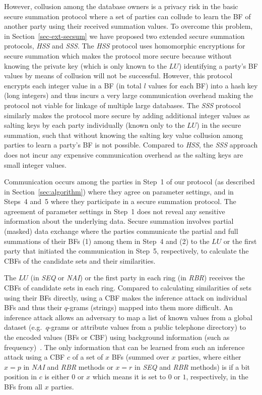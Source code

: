 \documentclass{sig-alternate}
\begin{document}
However, collusion among the database owners is a privacy risk
in the basic secure summation protocol where a set of parties
can collude to learn the BF of another party using their
received summation values. To overcome this problem, 
in Section~\ref{sec-ext-secsum} we have
proposed two extended secure summation protocols, \emph{HSS} and \emph{SSS}.
The \emph{HSS} protocol uses homomorphic encryptions for secure 
summation which makes the protocol more secure because without knowing the
private key (which is only known to the $LU$) identifying a party's
BF values by means of collusion will not be successful.
However, this protocol encrypts each integer value in a BF (in total
$l$ values for each BF)
into a hash key (long integers) and thus incurs 
a very large communication overhead making
the protocol not viable for linkage of multiple large databases.
The \emph{SSS} protocol similarly makes the protocol more secure 
by adding additional integer values as salting keys 
by each party individually (known only
to the $LU$) in the secure summation, such that without knowing
the salting key value collusion among parties to learn a party's BF 
is not possible. Compared to \emph{HSS}, the \emph{SSS} approach does not
incur any expensive communication overhead as the salting keys
are small integer values.

Communication occurs among the parties in Step~1 of our
protocol (as described in Section~\ref{sec:algorithm})
where they agree on parameter settings, and
in Steps~4 and~5
where they
participate in a secure summation protocol.
The agreement of parameter settings in Step~1 does not
reveal any sensitive information about the underlying data.
Secure summation involves partial (masked) data exchange
where the parties communicate the partial and full summations 
of their BFs (1) among them in Step~4
and (2) to the $LU$
or the first party that initiated the communication in Step~5, respectively,
to calculate the CBFs of the candidate sets and their similarities.

The $LU$ (in \emph{SEQ} or \emph{NAI}) or the first party 
in each ring (in \emph{RBR}) receives the CBFs
of candidate sets in each ring. Compared to calculating
similarities of sets using their BFs directly, using a CBF
makes the inference attack on individual BFs and thus
their $q$-grams (strings) mapped into them more difficult. 
An inference attack allows an adversary to map a list of known
values from a global dataset
(e.g.\ $q$-grams or attribute values from a public telephone directory) 
to the encoded values (BFs or CBF)
using background information (such as frequency)~\cite{Vat14,Kuz11}.
The only information that can be learned from such an inference attack
using a CBF $c$
of a set of $x$ BFs 
(summed over $x$ parties, where either $x=p$ in \emph{NAI} and \emph{RBR}
methods or $x = r$ in \emph{SEQ} and \emph{RBR} methods)
is if a bit position in $c$ is either $0$ or $x$
which means it is set to $0$ or $1$, respectively, in the BFs
from all $x$ parties.
\end{document}
